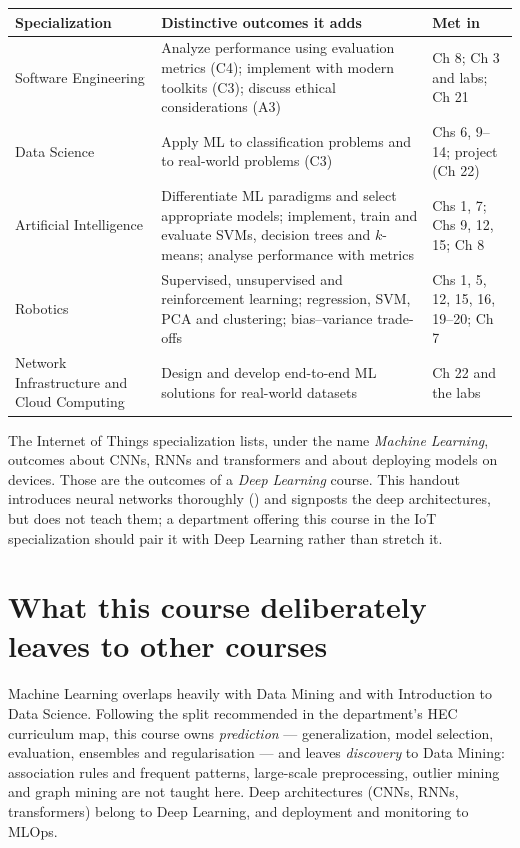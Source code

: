 \begin{longtable}{@{}L{3.1cm}L{8.2cm}L{3.7cm}@{}}
\toprule
{}
\textbf{Specialization} & \textbf{Distinctive outcomes it adds} & \textbf{Met in} \\
\midrule
\endhead
Software Engineering & Analyze performance using evaluation metrics (C4);
implement with modern toolkits (C3); discuss ethical considerations (A3) &
Ch 8; Ch 3 and labs; Ch 21 \\
Data Science & Apply ML to classification problems and to real-world problems
(C3) & Chs 6, 9--14; project (Ch 22) \\
Artificial Intelligence & Differentiate ML paradigms and select appropriate
models; implement, train and evaluate SVMs, decision trees and $k$-means;
analyse performance with metrics & Chs 1, 7; Chs 9, 12, 15; Ch 8 \\
Robotics & Supervised, unsupervised and reinforcement learning; regression, SVM,
PCA and clustering; bias--variance trade-offs & Chs 1, 5, 12, 15, 16, 19--20;
Ch 7 \\
Network Infrastructure and Cloud Computing & Design and develop end-to-end ML
solutions for real-world datasets & Ch 22 and the labs \\
\bottomrule
\end{longtable}

\begin{alertbox}
The Internet of Things specialization lists, under the name \emph{Machine
Learning}, outcomes about CNNs, RNNs and transformers and about deploying models
on devices. Those are the outcomes of a \emph{Deep Learning} course. This handout
introduces neural networks thoroughly () and signposts the deep
architectures, but does not teach them; a department offering this course in the
IoT specialization should pair it with Deep Learning rather than stretch it.
\end{alertbox}

\section*{What this course deliberately leaves to other courses}

Machine Learning overlaps heavily with Data Mining and with Introduction to Data
Science. Following the split recommended in the department's HEC curriculum map,
this course owns \emph{prediction} --- generalization, model selection,
evaluation, ensembles and regularisation --- and leaves \emph{discovery} to Data
Mining: association rules and frequent patterns, large-scale preprocessing,
outlier mining and graph mining are not taught here. Deep architectures (CNNs,
RNNs, transformers) belong to Deep Learning, and deployment and monitoring to
MLOps.

